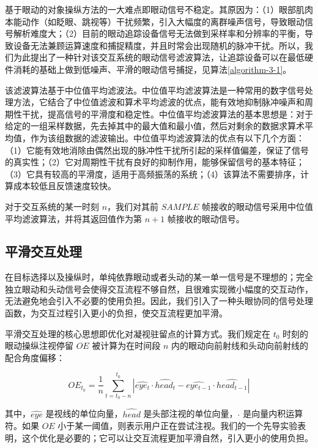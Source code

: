 基于眼动的对象操纵方法的一大难点即眼动信号不稳定。其原因为：（1）眼部肌肉本能动作（如眨眼、跳视等）干扰频繁，引入大幅度的离群噪声信号，导致眼动信号解析难度大；（2）目前的眼动追踪设备信号无法做到采样率和分辨率的平衡，导致设备无法兼顾运算速度和捕捉精度，并且时常会出现随机的脉冲干扰。所以，我们为此提出了一种针对该交互系统的眼动信号滤波算法，让追踪设备可以在最低硬件消耗的基础上做到低噪声、平滑的眼动信号捕捉，见算法\ref{algorithm-3-1}。

该滤波算法基于中位值平均滤波法。中位值平均滤波算法是一种常用的数字信号处理方法，它结合了中位值滤波和算术平均滤波的优点，能有效地抑制脉冲噪声和周期性干扰，提高信号的平滑度和稳定性。中位值平均滤波算法的基本思想是：对于给定的一组采样数据，先去掉其中的最大值和最小值，然后对剩余的数据求算术平均值，作为该组数据的滤波输出。中位值平均滤波算法的优点有以下几个方面：（1）它能有效地消除由偶然出现的脉冲性干扰所引起的采样值偏差，保证了信号的真实性；（2）它对周期性干扰有良好的抑制作用，能够保留信号的基本特征；（3）它具有较高的平滑度，适用于高频振荡的系统；（4）该算法不需要排序，计算成本较低且反馈速度较快。

对于交互系统的某一时刻 $n$，我们对其前 $SAMPLE$ 帧接收的眼动信号采用中位值平均滤波算法，并将其返回值作为第 $n + 1$ 帧接收的眼动信号。

\subsection{平滑交互处理}

在目标选择以及操纵时，单纯依靠眼动或者头动的某一单一信号是不理想的；完全独立眼动和头动信号会使得交互流程不够自然，且很难实现微小幅度的交互动作，无法避免地会引入不必要的使用负担。因此，我们引入了一种头眼协同的信号处理函数，为交互过程引入更小的负担，使交互流程更加平滑。

平滑交互处理的核心思想即优化对凝视驻留点的计算方式。我们规定在 $t_0$ 时刻的眼动操纵注视停留 $OE$ 被计算为在时间段 $n$ 内的眼动向前射线和头动向前射线的配合角度偏移：

\begin{equation}
	\label{formula-3-8}
	OE_{t_0} = \frac{1}{n} \sum_{t=t_0-n}^{t_0} \left| \hat{eye_t} \cdot \hat{head_t} - \hat{eye_{t-1}} \cdot \hat{head_{t-1}} \right|
\end{equation}

其中，$\hat{eye}$ 是视线的单位向量，$\hat{head}$ 是头部注视的单位向量，$\cdot$ 是向量内积运算符。如果 $OE$ 小于某一阈值，则表示用户正在尝试注视。我们的一个先导实验表明，这个优化是必要的；它可以让交互流程更加平滑自然，引入更小的使用负担。